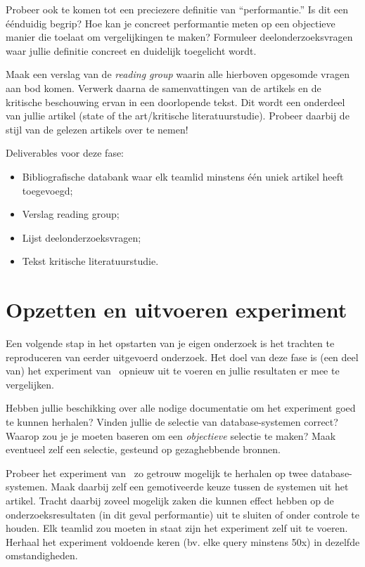 \documentclass[fleqn,10pt]{voorstel}
\begin{document}
Probeer ook te komen tot een preciezere definitie van ``performantie.'' Is dit een éénduidig begrip? Hoe kan je concreet performantie meten op een objectieve manier die toelaat om vergelijkingen te maken? Formuleer deelonderzoeksvragen waar jullie definitie concreet en duidelijk toegelicht wordt.

Maak een verslag van de \emph{reading group} waarin alle hierboven opgesomde vragen aan bod komen. Verwerk daarna de samenvattingen van de artikels en de kritische beschouwing ervan in een doorlopende tekst. Dit wordt een onderdeel van jullie artikel (state of the art/kritische literatuurstudie). Probeer daarbij de stijl van de gelezen artikels over te nemen!

Deliverables voor deze fase:

\begin{itemize}
	\item Bibliografische databank waar elk teamlid minstens één uniek artikel heeft toegevoegd;
	\item Verslag reading group;
	\item Lijst deelonderzoeksvragen;
	\item Tekst kritische literatuurstudie.
\end{itemize}

\section{Opzetten en uitvoeren experiment}

Een volgende stap in het opstarten van je eigen onderzoek is het trachten te reproduceren van eerder uitgevoerd onderzoek. Het doel van deze fase is (een deel van) het experiment van~\textcite{Bassil2012} opnieuw uit te voeren en jullie resultaten er mee te vergelijken.

Hebben jullie beschikking over alle nodige documentatie om het experiment goed te kunnen herhalen? Vinden jullie de selectie van database-systemen correct? Waarop zou je je moeten baseren om een \emph{objectieve} selectie te maken? Maak eventueel zelf een selectie, gesteund op gezaghebbende bronnen.

Probeer het experiment van~\textcite{Bassil2012} zo getrouw mogelijk te herhalen op twee database-systemen. Maak daarbij zelf een gemotiveerde keuze tussen de systemen uit het artikel. Tracht daarbij zoveel mogelijk zaken die kunnen effect hebben op de onderzoeksresultaten (in dit geval performantie) uit te sluiten of onder controle te houden. Elk teamlid zou moeten in staat zijn het experiment zelf uit te voeren. Herhaal het experiment voldoende keren (bv. elke query minstens 50x) in dezelfde omstandigheden. 
\end{document}

